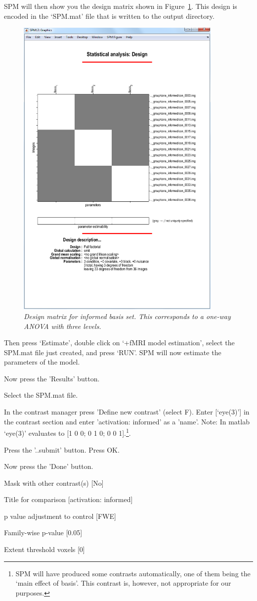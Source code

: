 SPM will then show you the design matrix shown in Figure~\ref{informed_design}. This design is encoded in the `SPM.mat' file that is written to the output directory.
\begin{figure}
\begin{center}
\includegraphics[width=100mm]{informed_design}
\caption{\em Design matrix for informed basis set. This corresponds to a one-way ANOVA with three levels. \label{informed_design}}
\end{center}
\end{figure}
Then press `Estimate', double click on `+fMRI model   estimation', select the SPM.mat file just created, and press `RUN'.
SPM will now estimate the parameters of the model.

\bi
\item{Now press the 'Results' button.}
\item{Select the SPM.mat file.}
\item{In the contrast manager press 'Define new contrast' (select F). Enter [`eye(3)'] in the contrast section and enter 'activation: informed' as a 'name'. Note: In matlab `eye(3)' evaluates to [1 0 0; 0 1 0; 0 0 1].\footnote{SPM will have produced some contrasts automatically, one of them being the `main effect of basis'. This contrast is, however, not 
appropriate for our purposes.}.}
\item{Press the '..submit' button. Press OK.}
\item{Now press the 'Done' button.}
\item{Mask with other contrast(s) [No]}
\item{Title for comparison [activation: informed]}
\item{p value adjustment to control [FWE]}
\item{Family-wise p-value [0.05]}
\item{Extent threshold {voxels} [0]}
\ei


